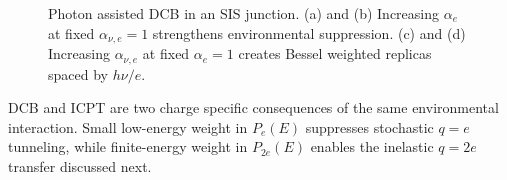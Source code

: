             \begin{figure}[t]
                \centering
                \hfill%
                \hfill%
                \hfill%
                \caption{
                    Resonant DCB in an SIS junction. (a) and (b) Increasing $\alpha_e$ at fixed $\alpha_{0,e}=1$ suppresses and broadens the quasiparticle features. (c) and (d) Increasing $\alpha_{0,e}$ at fixed $\alpha_e=1$ transfers weight to Poisson weighted satellites spaced by $\hbar\omega_0/e$.
                    }
                \label{fig:stochastic:dcb-resonant}
                
                \vspace{1em}

                \hfill%
                \hfill%
                \hfill%
                \caption{
                    Photon assisted DCB in an SIS junction. (a) and (b) Increasing $\alpha_e$ at fixed $\alpha_{\nu,e}=1$ strengthens environmental suppression. (c) and (d) Increasing $\alpha_{\nu,e}$ at fixed $\alpha_e=1$ creates Bessel weighted replicas spaced by $h\nu/e$.
                    }
                \label{fig:stochastic:dcb-pat}
            \end{figure}

            DCB and ICPT are two charge specific consequences of the same environmental interaction. Small low-energy weight in $P_e(E)$ suppresses stochastic $q=e$ tunneling, while finite-energy weight in $P_{2e}(E)$ enables the inelastic $q=2e$ transfer discussed next.

